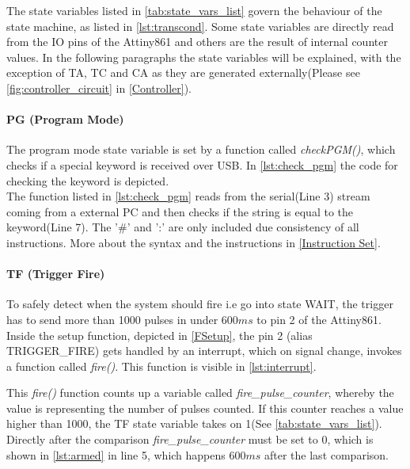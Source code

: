 \noindent The state variables listed in \cref{tab:state_vars_list} govern the behaviour of the state machine, as listed in \cref{lst:transcond}. Some state variables are directly read from the IO pins of the Attiny861 and others are the result of internal counter values. In the following paragraphs the state variables will be explained, with the exception of TA, TC and CA as they are generated externally(Please see \cref{fig:controller_circuit} in \cref{Controller}). \\

\pagebreak

\paragraph{PG (Program Mode)}
The program mode state variable is set by a function called \textit{checkPGM()}, which checks if a special keyword is received over USB. In \cref{lst:check_pgm} the code for checking the keyword is depicted.\\



\noindent The function listed in \cref{lst:check_pgm} reads from the serial(Line 3) stream coming from a external PC and then checks if the string is equal to the keyword(Line 7). The '\#' and ':' are only included due consistency of all instructions. More about the syntax and the instructions in \cref{Instruction Set}.

\paragraph{TF (Trigger Fire)}
To safely detect when the system should fire i.e go into state WAIT, the trigger has to send more than 1000 pulses in under $600ms$ to pin 2 of the Attiny861. Inside the setup function, depicted in \cref{FSetup}, the pin 2 (alias TRIGGER\_FIRE) gets handled by an interrupt, which on signal change, invokes a function called \textit{fire()}. This function is visible in \cref{lst:interrupt}.



\noindent This \textit{fire()} function counts up a variable called \textit{fire\_pulse\_counter}, whereby the value is representing the number of pulses counted. If this counter reaches a value higher than 1000, the TF state variable takes on 1(See \cref{tab:state_vars_list}). Directly after the comparison \textit{fire\_pulse\_counter} must be set to 0, which is shown in \cref{lst:armed} in line 5, which happens $600ms$ after the last comparison.

